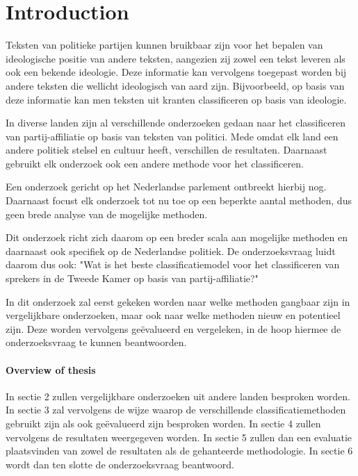 \section{Introduction}
\label{sec:intro}
Teksten van politieke partijen kunnen bruikbaar zijn voor het bepalen van ideologische positie van andere teksten, aangezien zij zowel een tekst leveren als ook een bekende ideologie. Deze informatie kan vervolgens toegepast worden bij andere teksten die wellicht ideologisch van aard zijn. Bijvoorbeeld, op basis van deze informatie kan men teksten uit kranten classificeren op basis van ideologie.\par
In diverse landen zijn al verschillende onderzoeken gedaan naar het classificeren van partij-affiliatie op basis van teksten van politici.\cite{Ferreira2016UsingTT} Mede omdat elk land een andere politiek stelsel en cultuur heeft, verschillen de resultaten. Daarnaast gebruikt elk onderzoek ook een andere methode voor het classificeren. \par
Een onderzoek gericht op het Nederlandse parlement ontbreekt hierbij nog. Daarnaast focust elk onderzoek tot nu toe op een beperkte aantal methoden, dus geen brede analyse van de mogelijke methoden. \par
Dit onderzoek richt zich daarom op een breder scala aan mogelijke methoden en daarnaast ook specifiek op de Nederlandse politiek. De onderzoeksvraag luidt daarom dus ook: "Wat is het beste classificatiemodel voor het classificeren van sprekers in de Tweede Kamer op basis van partij-affiliatie?"\par
In dit onderzoek zal eerst gekeken worden naar welke methoden gangbaar zijn in vergelijkbare onderzoeken, maar ook naar welke methoden nieuw en potentieel zijn. Deze worden vervolgens geëvalueerd en vergeleken, in de hoop hiermee de onderzoeksvraag te kunnen beantwoorden.


\paragraph{Overview of thesis}
In sectie 2 zullen vergelijkbare onderzoeken uit andere landen besproken worden. In sectie 3 zal vervolgens de wijze waarop de verschillende classificatiemethoden gebruikt zijn als ook geëvalueerd zijn besproken worden. In sectie 4 zullen vervolgens de resultaten weergegeven worden. In sectie 5 zullen dan een evaluatie plaatsvinden van zowel de resultaten als de gehanteerde methodologie. In sectie 6 wordt dan ten slotte de onderzoeksvraag beantwoord.
